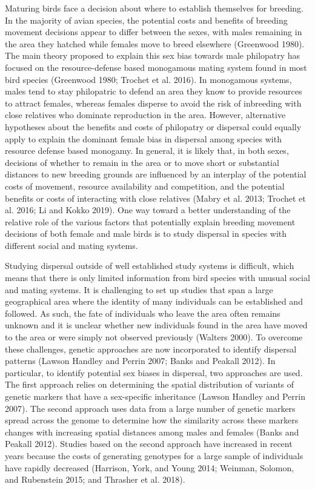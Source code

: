\documentclass[]{article}
\begin{document}
Maturing birds face a decision about where to establish themselves for
breeding. In the majority of avian species, the potential costs and
benefits of breeding movement decisions appear to differ between the
sexes, with males remaining in the area they hatched while females move
to breed elsewhere (Greenwood 1980). The main theory proposed to explain
this sex bias towards male philopatry has focused on the
resource-defense based monogamous mating system found in most bird
species (Greenwood 1980; Trochet et al. 2016). In monogamous systems,
males tend to stay philopatric to defend an area they know to provide
resources to attract females, whereas females disperse to avoid the risk
of inbreeding with close relatives who dominate reproduction in the
area. However, alternative hypotheses about the benefits and costs of
philopatry or dispersal could equally apply to explain the dominant
female bias in dispersal among species with resource defense based
monogamy. In general, it is likely that, in both sexes, decisions of
whether to remain in the area or to move short or substantial distances
to new breeding grounds are influenced by an interplay of the potential
costs of movement, resource availability and competition, and the
potential benefits or costs of interacting with close relatives (Mabry
et al. 2013; Trochet et al. 2016; Li and Kokko 2019). One way toward a
better understanding of the relative role of the various factors that
potentially explain breeding movement decisions of both female and male
birds is to study dispersal in species with different social and mating
systems.

Studying dispersal outside of well established study systems is
difficult, which means that there is only limited information from bird
species with unusual social and mating systems. It is challenging to set
up studies that span a large geographical area where the identity of
many individuals can be established and followed. As such, the fate of
individuals who leave the area often remains unknown and it is unclear
whether new individuals found in the area have moved to the area or were
simply not observed previously (Walters 2000). To overcome these
challenges, genetic approaches are now incorporated to identify
dispersal patterns (Lawson Handley and Perrin 2007; Banks and Peakall
2012). In particular, to identify potential sex biases in dispersal, two
approaches are used. The first approach relies on determining the
spatial distribution of variants of genetic markers that have a
sex-specific inheritance (Lawson Handley and Perrin 2007). The second
approach uses data from a large number of genetic markers spread across
the genome to determine how the similarity across these markers changes
with increasing spatial distances among males and females (Banks and
Peakall 2012). Studies based on the second approach have increased in
recent years because the costs of generating genotypes for a large
sample of individuals have rapidly decreased (Harrison, York, and Young
2014; Weinman, Solomon, and Rubenstein 2015; and Thrasher et al. 2018).
\end{document}
